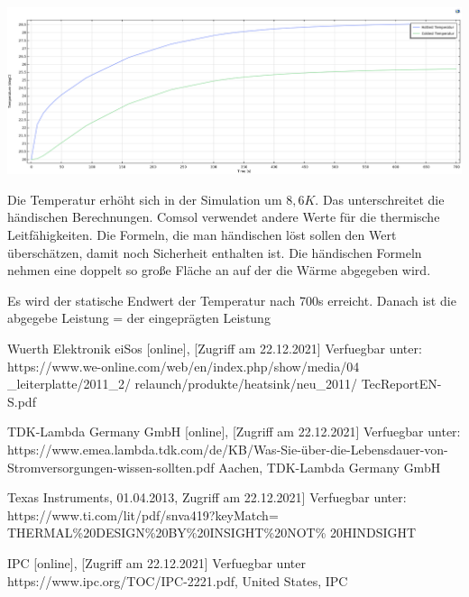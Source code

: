 \documentclass[10pt,a4paper,oneside,abstracton]{scrartcl}
\newenvironment{Figure}
  {\par\medskip\noindent\minipage{\linewidth}}
  {\endminipage\par\medskip}
\begin{document}
\begin{multicols}{2}
\begin{Figure}
	\includegraphics[width=\textwidth]{Bilder/time_dep.png}
	\label{voltage}
\end{Figure}


Die Temperatur erhöht sich in der Simulation um $8,6 K$. 
Das unterschreitet die  händischen Berechnungen. Comsol verwendet andere Werte für die thermische Leitfähigkeiten.
Die Formeln, die man händischen löst sollen den Wert überschätzen, damit noch Sicherheit enthalten ist. 
Die händischen Formeln nehmen eine doppelt so große Fläche an auf der die Wärme abgegeben wird. 

Es wird der statische Endwert der Temperatur nach 700s erreicht. Danach ist die abgegebe Leistung = der eingeprägten Leistung

\noindent
\begin{thebibliography}{9}

Wuerth Elektronik eiSos  [online], [Zugriff am 22.12.2021] Verfuegbar unter:
 https://www.we-online.com/web/en/index.php/show/media/04
 \_leiterplatte/2011\_2/ relaunch/produkte/heatsink/neu\_2011/
 TecReport\-EN-S.pdf


TDK-Lambda Germany GmbH [online], [Zugriff am 22.12.2021] Verfuegbar unter:	https://www.emea.lambda.tdk.com/de/KB/Was-Sie-über-die-Lebensdauer-von-Stromversorgungen-wissen-sollten.pdf
Aachen, TDK-Lambda Germany GmbH



Texas Instruments, 01.04.2013, Zugriff am 22.12.2021] Verfuegbar unter: https://www.ti.com/lit/pdf/snva419?keyMatch=
THERMAL\%20DESIGN\%20BY\%20INSIGHT\%20NOT\%
20HINDSIGHT

IPC  [online], [Zugriff am 22.12.2021] Verfuegbar unter https://www.ipc.org/TOC/IPC-2221.pdf, United States, IPC


\end{thebibliography}
\end{multicols}
\end{document}
